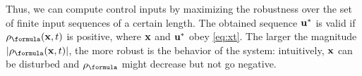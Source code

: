 Thus, we can compute control inputs by maximizing the robustness over the set of finite input sequences of a certain length.
The obtained sequence $\mathbf{u}^*$ is valid if $\robf(\sstraj,t)$ is positive, where $\mathbf{x}$ and $\mathbf{u}^*$ obey \eqref{eq:xt}.
The larger the magnitude $|\robf(\sstraj,t)|$, the more robust is the behavior of the system: intuitively, $\mathbf{x}$ can be disturbed and $\robf$ might decrease but not go negative.
